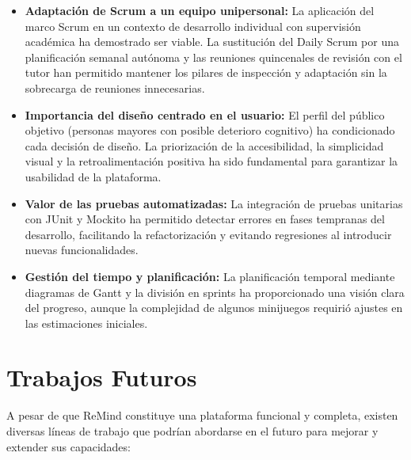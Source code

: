 \begin{itemize}
    \item \textbf{Adaptación de Scrum a un equipo unipersonal:} La aplicación del marco Scrum en un contexto de desarrollo individual con supervisión académica ha demostrado ser viable. La sustitución del Daily Scrum por una planificación semanal autónoma y las reuniones quincenales de revisión con el tutor han permitido mantener los pilares de inspección y adaptación sin la sobrecarga de reuniones innecesarias.
    \item \textbf{Importancia del diseño centrado en el usuario:} El perfil del público objetivo (personas mayores con posible deterioro cognitivo) ha condicionado cada decisión de diseño. La priorización de la accesibilidad, la simplicidad visual y la retroalimentación positiva ha sido fundamental para garantizar la usabilidad de la plataforma.
    \item \textbf{Valor de las pruebas automatizadas:} La integración de pruebas unitarias con JUnit y Mockito ha permitido detectar errores en fases tempranas del desarrollo, facilitando la refactorización y evitando regresiones al introducir nuevas funcionalidades.
    \item \textbf{Gestión del tiempo y planificación:} La planificación temporal mediante diagramas de Gantt y la división en sprints ha proporcionado una visión clara del progreso, aunque la complejidad de algunos minijuegos requirió ajustes en las estimaciones iniciales.
\end{itemize}

\section{Trabajos Futuros}

A pesar de que ReMind constituye una plataforma funcional y completa, existen diversas líneas de trabajo que podrían abordarse en el futuro para mejorar y extender sus capacidades:

